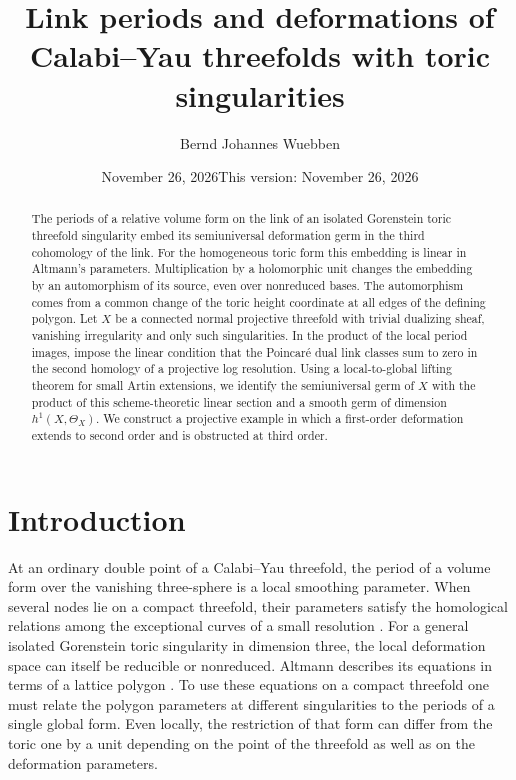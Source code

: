 \documentclass[11pt]{amsart}
\title[Link periods and Calabi--Yau deformations]{Link periods and deformations of Calabi--Yau threefolds with toric singularities}
\author{Bernd Johannes Wuebben}
\date{November 26, 2026\newline This version: November 26, 2026}
\theoremstyle{definition}
\theoremstyle{remark}
\begin{document}
\begin{abstract}
The periods of a relative volume form on the link of an isolated Gorenstein
toric threefold singularity embed its semiuniversal deformation germ in
the third cohomology of the link. For the homogeneous toric form this
embedding is linear in Altmann's parameters. Multiplication by a
holomorphic unit changes the embedding by an automorphism of its source,
even over nonreduced bases. The automorphism comes from a common change
of the toric height coordinate at all edges of the defining polygon.
Let $X$ be a connected normal projective threefold with trivial
dualizing sheaf, vanishing irregularity and only such singularities.
In the product of the local period images, impose the linear condition
that the Poincar\'e dual link classes sum to zero in the second homology
of a projective log resolution. Using a local-to-global lifting theorem
for small Artin extensions, we identify the semiuniversal germ of $X$ with
the product of this scheme-theoretic linear section and a smooth germ
of dimension $h^1(X,\Theta_X)$. We construct a projective example in
which a first-order deformation extends to second order and is
obstructed at third order.
\end{abstract}
\maketitle
\enlargethispage{2pt}

\section{Introduction}

At an ordinary double point of a Calabi--Yau threefold, the period of a
volume form over the vanishing three-sphere is a local smoothing
parameter. When several nodes lie on a compact threefold, their
parameters satisfy the homological relations among the exceptional
curves of a small resolution \cite{Fri,LLW}. For a general isolated
Gorenstein toric singularity in dimension three, the local deformation
space can itself be reducible or nonreduced. Altmann describes its
equations in terms of a lattice polygon \cite{Alt}. To use these
equations on a compact threefold one must relate the polygon parameters
at different singularities to the periods of a single global form.
Even locally, the restriction of that form can differ from the toric
one by a unit depending on the point of the threefold as well as on
the deformation parameters.
\end{document}
